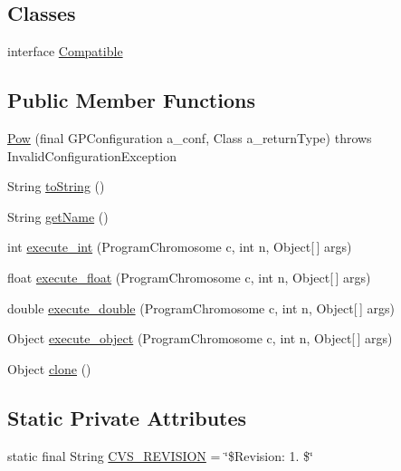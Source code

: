 \subsection*{Classes}
\begin{DoxyCompactItemize}
\item 
interface \hyperlink{interfaceorg_1_1jgap_1_1gp_1_1function_1_1_pow_1_1_compatible}{Compatible}
\end{DoxyCompactItemize}
\subsection*{Public Member Functions}
\begin{DoxyCompactItemize}
\item 
\hyperlink{classorg_1_1jgap_1_1gp_1_1function_1_1_pow_a50c709f30400b67ad355bcde3e5a62c5}{Pow} (final G\-P\-Configuration a\-\_\-conf, Class a\-\_\-return\-Type)  throws Invalid\-Configuration\-Exception 
\item 
String \hyperlink{classorg_1_1jgap_1_1gp_1_1function_1_1_pow_a0cf6c5a8a2b3710668310ca9aa047f19}{to\-String} ()
\item 
String \hyperlink{classorg_1_1jgap_1_1gp_1_1function_1_1_pow_a9f0e1b8d395b52044fa13153f51dcb1e}{get\-Name} ()
\item 
int \hyperlink{classorg_1_1jgap_1_1gp_1_1function_1_1_pow_a8a92c0322eb20e1e6615ee0e5e724c49}{execute\-\_\-int} (Program\-Chromosome c, int n, Object\mbox{[}$\,$\mbox{]} args)
\item 
float \hyperlink{classorg_1_1jgap_1_1gp_1_1function_1_1_pow_a1531d34a56523b35f0f05f62dd882437}{execute\-\_\-float} (Program\-Chromosome c, int n, Object\mbox{[}$\,$\mbox{]} args)
\item 
double \hyperlink{classorg_1_1jgap_1_1gp_1_1function_1_1_pow_ac59150e52efe398993317036d909272f}{execute\-\_\-double} (Program\-Chromosome c, int n, Object\mbox{[}$\,$\mbox{]} args)
\item 
Object \hyperlink{classorg_1_1jgap_1_1gp_1_1function_1_1_pow_aa3ca55ca5567067cb4892c3722b75375}{execute\-\_\-object} (Program\-Chromosome c, int n, Object\mbox{[}$\,$\mbox{]} args)
\item 
Object \hyperlink{classorg_1_1jgap_1_1gp_1_1function_1_1_pow_ad67b570253f812cbbd8b38ba6d0e7497}{clone} ()
\end{DoxyCompactItemize}
\subsection*{Static Private Attributes}
\begin{DoxyCompactItemize}
\item 
static final String \hyperlink{classorg_1_1jgap_1_1gp_1_1function_1_1_pow_a3f35084162c1b0c190fb754c235bb661}{C\-V\-S\-\_\-\-R\-E\-V\-I\-S\-I\-O\-N} = \char`\"{}\$Revision\-: 1. \$\char`\"{}
\end{DoxyCompactItemize}
